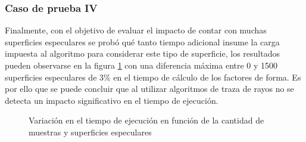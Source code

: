 \subsubsection{Caso de prueba IV}

Finalmente, con el objetivo de evaluar el impacto de contar con muchas superficies especulares se probó qué tanto tiempo adicional insume la carga impuesta al algoritmo para considerar este tipo de superficie, los resultados pueden observarse en la figura \ref{plot:este} con una diferencia máxima entre 0 y 1500 superficies especulares de 3\% en el tiempo de cálculo de los factores de forma. Es por ello que se puede concluir que al utilizar algoritmos de traza de rayos no se detecta un impacto significativo en el tiempo de ejecución.

\begin{figure}
\caption{Variación en el tiempo de ejecución en función de la cantidad de muestras y superficies especulares}
\label{plot:este}
\end{figure}


